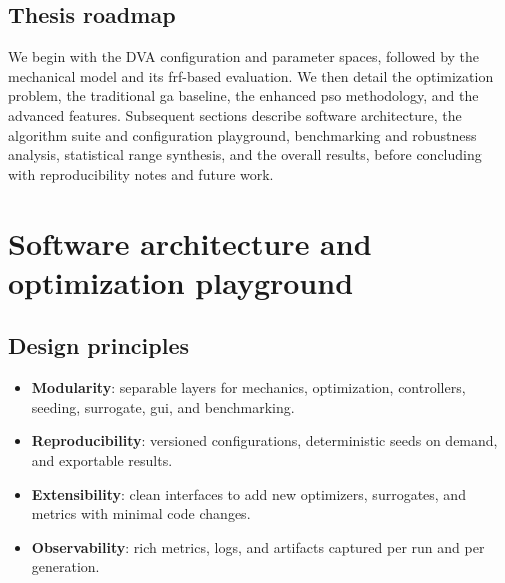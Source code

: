 \documentclass[12pt,a4paper]{article}
\begin{document}
\subsection{Thesis roadmap}
\label{subsec:roadmap}
We begin with the DVA configuration and parameter spaces, followed by the mechanical model and its \gls{frf}-based evaluation. We then detail the optimization problem, the traditional \gls{ga} baseline, the enhanced \gls{pso} methodology, and the advanced features. Subsequent sections describe software architecture, the algorithm suite and configuration playground, benchmarking and robustness analysis, statistical range synthesis, and the overall results, before concluding with reproducibility notes and future work.


\section{Software architecture and optimization playground}
\label{sec:architecture}

\subsection{Design principles}
\begin{itemize}
    \item \textbf{Modularity}: separable layers for mechanics, optimization, controllers, seeding, surrogate, \gls{gui}, and benchmarking.
    \item \textbf{Reproducibility}: versioned configurations, deterministic seeds on demand, and exportable results.
    \item \textbf{Extensibility}: clean interfaces to add new optimizers, surrogates, and metrics with minimal code changes.
    \item \textbf{Observability}: rich metrics, logs, and artifacts captured per run and per generation.
\end{itemize}
\end{document}

